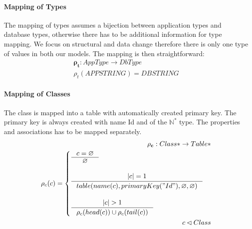 \documentclass[11pt]{article}
\begin{document}
\paragraph{Mapping of Types} The mapping of types assumes a bijection between application types and database types, otherwise there has to be additional information for type mapping. We focus on structural and data change therefore there is only one type of values in both our models. The mapping is then straightforward:
\begin{align*}
	\mathbf{\rho_{t}} : AppType \rightarrow DbType  \\
 	\rho_{t}(APPSTRING) = DBSTRING 
\end{align*}

\paragraph{Mapping of Classes} The class is mapped into a table with  automatically created primary key. The primary key is always created with name Id and of the $\mathbb{N^{*}}$ type. The properties and associations has to be mapped separately.
\begin{align*}
	\mathbf{\rho_{c}} : Class*  \rightarrow Table* \\
	\rho_{c}(c) = \begin{cases}
		\inference{c = \varnothing}{\varnothing}\\\\
		\inference{|c| = 1}{table(name(c), primaryKey("Id"), \varnothing, \varnothing)}  \\ \\
		\inference{|c| > 1}{\rho_c(head(c)) \cup \rho_c(tail(c))}
 \end{cases}\\
 c \lhd Class
\end{align*}
\end{document}
